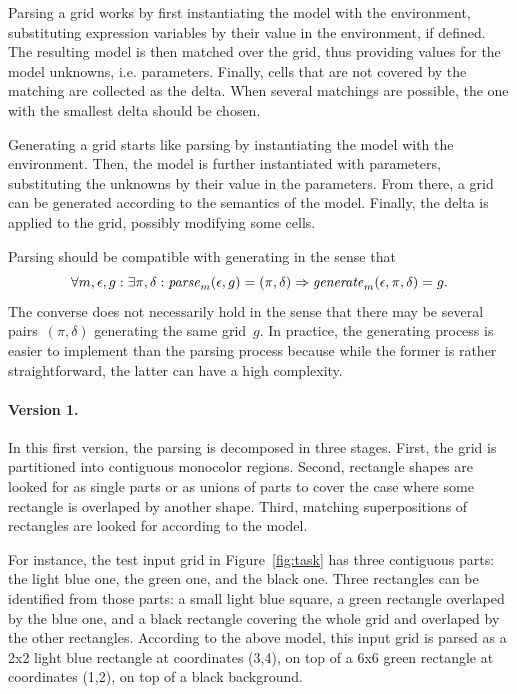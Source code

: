 \documentclass[a4paper]{llncs}
\begin{document}
Parsing a grid works by first instantiating the model with the
environment, substituting expression variables by their value in the
environment, if defined. The resulting model is then matched over the
grid, thus providing values for the model unknowns,
i.e. parameters. Finally, cells that are not covered by the matching
are collected as the delta.  When several matchings are possible, the
one with the smallest delta should be chosen.

Generating a grid starts like parsing by instantiating the model with
the environment. Then, the model is further instantiated with
parameters, substituting the unknowns by their value in the
parameters. From there, a grid can be generated according to the
semantics of the model. Finally, the delta is applied to the grid,
possibly modifying some cells.

Parsing should be compatible with generating in the sense that
\[ \forall m, \epsilon, g: \exists \pi, \delta: {\it
    parse}_m(\epsilon,g) = (\pi,\delta) \Rightarrow {\it
    generate}_m(\epsilon,\pi,\delta) = g. \] The converse does not
necessarily hold in the sense that there may be several
pairs~$(\pi,\delta)$ generating the same grid~$g$. In practice, the
generating process is easier to implement than the parsing process
because while the former is rather straightforward, the latter can
have a high complexity.

\paragraph{Version 1.} In this first version, the parsing is
decomposed in three stages. First, the grid is partitioned into
contiguous monocolor regions. Second, rectangle shapes are looked for
as single parts or as unions of parts to cover the case where some
rectangle is overlaped by another shape. Third, matching
superpositions of rectangles are looked for according to the model.

For instance, the test input grid in Figure~\ref{fig:task} has three
contiguous parts: the light blue one, the green one, and the black
one. Three rectangles can be identified from those parts: a small
light blue square, a green rectangle overlaped by the blue one, and a
black rectangle covering the whole grid and overlaped by the other
rectangles. According to the above model, this input grid is parsed as
a 2x2 light blue rectangle at coordinates (3,4), on top of a 6x6 green
rectangle at coordinates (1,2), on top of a black background.
\end{document}

